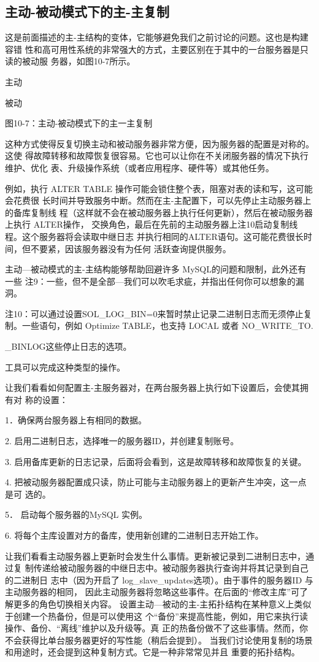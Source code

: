 \subsection{主动-被动模式下的主-主复制}
这是前面描述的主-主结构的变体，它能够避免我们之前讨论的问题。这也是构建容错
性和高可用性系统的非常强大的方式，主要区别在于其中的一台服务器是只读的被动服
务器，如图10-7所示。

主动

被动

图10-7：主动-被动模式下的主一主复制

这种方式使得反复切换主动和被动服务器非常方便，因为服务器的配置是对称的。这使
得故障转移和故障恢复很容易。它也可以让你在不关闭服务器的情况下执行维护、优化
表、升级操作系统（或者应用程序、硬件等）或其他任务。

例如，执行 ALTER TABLE 操作可能会锁住整个表，阻塞对表的读和写，这可能会花费很
长时间并导致服务中断。然而在主-主配置下，可以先停止主动服务器上的备库复制线
程（这样就不会在被动服务器上执行任何更新），然后在被动服务器上执行 ALTER操作，
交换角色，最后在先前的主动服务器上注10启动复制线程。这个服务器将会读取中继日志
并执行相同的ALTER语句。这可能花费很长时间，但不要紧，因该服务器没有为任何
活跃查询提供服务。

主动—被动模式的主-主结构能够帮助回避许多 MySQL的问题和限制，此外还有一些
注9：一些，但不是全部—我们可以吹毛求疵，并指出任何你可以想象的漏洞。

注10：可以通过设置SOL\_LOG\_BIN=0来暂时禁止记录二进制日志而无须停止复制。一些语句，例如
Optimize TABLE，也支持 LOCAL 或者 NO\_WRITE\_TO.

\_BINLOG这些停止日志的选项。

工具可以完成这种类型的操作。

让我们看看如何配置主-主服务器对，在两台服务器上执行如下设置后，会使其拥有对
称的设置：

1．确保两台服务器上有相同的数据。

2. 启用二进制日志，选择唯一的服务器ID，并创建复制账号。

3. 启用备库更新的日志记录，后面将会看到，这是故障转移和故障恢复的关键。

4. 把被动服务器配置成只读，防止可能与主动服务器上的更新产生冲突，这一点是可
选的。

5． 启动每个服务器的MySQL 实例。

6. 将每个主库设置对方的备库，使用新创建的二进制日志开始工作。

让我们看看主动服务器上更新时会发生什么事情。更新被记录到二进制日志中，通过复
制传递给被动服务器的中继日志中。被动服务器执行查询并将其记录到自己的二进制日
志中（因为开启了 log\_slave\_updates选项）。由于事件的服务器ID 与主动服务器的相同，
因此主动服务器将忽略这些事件。在后面的“修改主库”可了解更多的角色切换相关内容。
设置主动—被动的主-主拓扑结构在某种意义上类似于创建一个热备份，但是可以使用这
个“备份”来提高性能，例如，用它来执行读操作、备份、“离线”维护以及升级等。真
正的热备份做不了这些事情。然而，你不会获得比单台服务器更好的写性能（稍后会提到）。
当我们讨论使用复制的场景和用途时，还会提到这种复制方式。它是一种非常常见并且
重要的拓扑结构。

